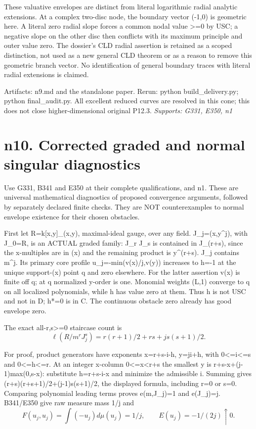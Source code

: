 \documentclass[11pt]{article}
\begin{document}
These valuative envelopes are distinct from literal logarithmic radial analytic extensions. At a complex two-disc node, the boundary vector (-1,0) is geometric here. A literal zero radial slope forces a common nodal value >=0 by USC; a negative slope on the other disc then conflicts with its maximum principle and outer value zero. The dossier's CLD radial assertion is retained as a scoped distinction, not used as a new general CLD theorem or as a reason to remove this geometric branch vector. No identification of general boundary traces with literal radial extensions is claimed.

Artifacts: n9.md and the standalone paper. Rerun: python build\_delivery.py; python final\_audit.py. All excellent reduced curves are resolved in this cone; this does not close higher-dimensional original P12.3.
\textit{Supports: G331, E350, n1}

\section{n10. Corrected graded and normal singular diagnostics}

Use G331, B341 and E350 at their complete qualifications, and n1. These are universal mathematical diagnostics of proposed convergence arguments, followed by separately declared finite checks. They are NOT counterexamples to normal envelope existence for their chosen obstacles.

First let R=k[x,y]\_(x,y), maximal-ideal gauge, over any field. J\_j=(x,y\textasciicircum{}j), with J\_0=R, is an ACTUAL graded family: J\_r J\_s is contained in J\_(r+s), since the x-multiples are in (x) and the remaining product is y\textasciicircum{}(r+s). J\_j contains m\textasciicircum{}j. Its primary core profile u\_j=-min(v(x)/j,v(y)) increases to h=-1 at the unique support-(x) point q and zero elsewhere. For the latter assertion v(x) is finite off q; at q normalized y-order is one. Monomial weights (L,1) converge to q on all localized polynomials, while h has value zero at them. Thus h is not USC and not in D; h*=0 is in C. The continuous obstacle zero already has good envelope zero.

The exact all-r,s>=0 staircase count is
\[
\ell(R/m^r J_j^s)=r(r+1)/2+rs+j s(s+1)/2.
\]

For proof, product generators have exponents x=r+s-i-h, y=ji+h, with 0<=i<=s and 0<=h<=r. At an integer x-column 0<=x<r+s the smallest y is r+s-x+(j-1)max(0,s-x): substitute h=r+s-i-x and minimize the admissible i. Summing gives (r+s)(r+s+1)/2+(j-1)s(s+1)/2, the displayed formula, including r=0 or s=0. Comparing polynomial leading terms proves e(m,J\_j)=1 and e(J\_j)=j. B341/E350 give raw measure mass 1/j and
\[
F(u_j,u_j)=\int(-u_j)d\mu(u_j)=1/j,
\qquad E(u_j)=-1/(2j)\uparrow0.
\]
\end{document}
